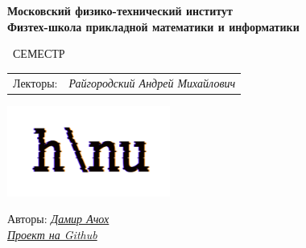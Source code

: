 \begin{titlepage}
	\clearpage\thispagestyle{empty}
	\centering
	
	\textbf{Московский физико-технический институт \\ Физтех-школа прикладной математики и информатики}
	\vspace{33ex}
	
	{\textbf{\FullCourseNameFirstPart}}
	
	\SemesterNumber\ СЕМЕСТР  
	\vspace{1ex}
	\begin{center}
		\begin{tabular}{rr}
			Лекторы:\!\!\!\!& \textit{Райгородский Андрей Михайлович}
		\end{tabular}
	\end{center}
	
	\includegraphics[width=0.4\textwidth]{images/logo_ltc.png}

	\begin{flushright}
		\noindent
		Авторы: \href{https://vk.com/kchaugi}{\textit{Дамир Ачох}}
		\\
		\href{\GithubLink}{\textit{Проект на Github}}
	\end{flushright}
	
	\vfill
	\CourseDate
	\pagebreak
\end{titlepage}
